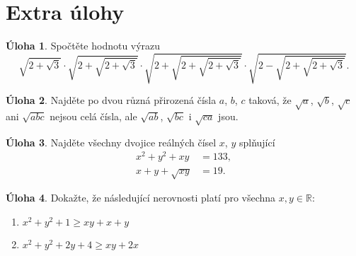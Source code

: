 \documentclass[10pt,a6paper,landscape]{article}
\newcommand{\R}{\mathbb{R}}
\def\tiskctyr{%
\newbox\shipouthackbox
\pdfpagewidth=2\pdfpagewidth
\pdfpageheight=2\pdfpageheight
\let\oldshipout=\shipout
\def\shipout{\afterassignment\zctyrtmp \setbox\shipouthackbox=}%
\def\zctyrtmp{\aftergroup\zctyr}%
\def\zctyr{%
    \offinterlineskip
    \oldshipout\vbox{\hbox{%
        \copy\shipouthackbox
        \hskip\dimexpr .5\pdfpagewidth-\wd\shipouthackbox\relax
        \copy\shipouthackbox
    }%
    \vskip\dimexpr .5\pdfpageheight-\ht\shipouthackbox\relax
    \hbox{%
        \copy\shipouthackbox
        \hskip\dimexpr .5\pdfpagewidth-\wd\shipouthackbox\relax
        \box\shipouthackbox
    }}%
}}
\theoremstyle{definition}
\newtheorem{uloha}{\atr Úloha}
\def\atr{}
\def\R{\mathbb{R}}
\begin{document}

\section*{Extra úlohy}


\begin{uloha}
Spočtěte hodnotu výrazu
$$\sqrt{2+\sqrt{3}}\cdot\sqrt{2+\sqrt{2+\sqrt{3}}}\cdot\sqrt{2+\sqrt{2+\sqrt{2+\sqrt{3}}}}\cdot\sqrt{2-\sqrt{2+\sqrt{2+\sqrt{3}}}}.$$
\end{uloha}


\begin{uloha}
Najděte po dvou různá přirozená čísla $a$, $b$, $c$ taková, že $\sqrt a$, $\sqrt b$, $\sqrt c$ ani $\sqrt{abc}$ nejsou celá čísla, ale $\sqrt{ab}$, $\sqrt{bc}$ i $\sqrt{ca}$ jsou.
\end{uloha}


\begin{uloha}
Najděte všechny dvojice reálných čísel $x$, $y$ splňující
\begin{align*}
  x^2 + y^2 + xy &= 133,  \\
  x + y + \sqrt{xy} &= 19.
\end{align*}
\end{uloha}


\begin{uloha}
Dokažte, že následující nerovnosti platí pro všechna $x, y \in \R$:
\begin{enumerate}
    \item $x^2 + y^2 + 1 \geq xy + x + y$
    \item $x^2 + y^2 + 2y + 4 \geq xy + 2x$
\end{enumerate}
\end{uloha}
\end{document}
